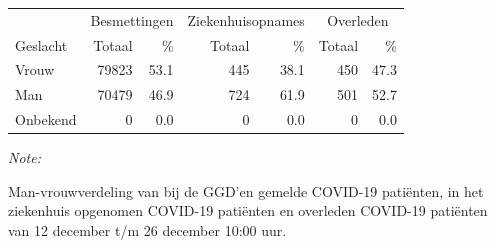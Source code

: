 \documentclass[
  english,
  man,floatsintext]{apa6}
\begin{document}
\begin{table}[H]
\centering\begingroup\fontsize{11}{13}\selectfont

\begin{threeparttable}
\begin{tabular}{lrrrrrr}
\toprule
\multicolumn{1}{c}{ } & \multicolumn{2}{c}{Besmettingen} & \multicolumn{2}{c}{Ziekenhuisopnames} & \multicolumn{2}{c}{Overleden} \\
\cmidrule(l{3pt}r{3pt}){2-3} \cmidrule(l{3pt}r{3pt}){4-5} \cmidrule(l{3pt}r{3pt}){6-7}
Geslacht & Totaal & \% & Totaal & \% & Totaal & \%\\
\midrule
Vrouw & 79823 & 53.1 & 445 & 38.1 & 450 & 47.3\\
Man & 70479 & 46.9 & 724 & 61.9 & 501 & 52.7\\
Onbekend & 0 & 0.0 & 0 & 0.0 & 0 & 0.0\\
\bottomrule
\end{tabular}
\begin{tablenotes}
\item \textit{Note: } 
\item Man-vrouwverdeling van bij de GGD’en gemelde COVID-19 patiënten, in het ziekenhuis opgenomen COVID-19 patiënten en overleden COVID-19 patiënten van 12 december t/m 26 december 10:00 uur.
\end{tablenotes}
\end{threeparttable}
\endgroup{}
\end{table}
\newpage
\end{document}
